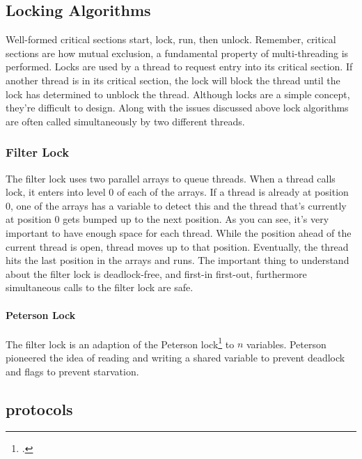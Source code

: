 \documentclass[titlepage]{article}
\begin{document}
\subsection{Locking Algorithms}

Well-formed critical sections start, lock, run, then unlock. Remember, critical sections are how mutual exclusion, a fundamental property of multi-threading is performed.  Locks are used by a thread to request entry into its critical section. If another thread is in its critical section, the lock will block the thread until the lock has determined to unblock the thread. Although locks are a simple concept, they're difficult to design. Along with the issues discussed above lock algorithms are often called simultaneously by two different threads.

\subsubsection{Filter Lock}

The filter lock uses two parallel arrays to queue threads. When a thread calls lock, it enters into level 0 of each of the arrays. If a thread is already at position 0, one of the arrays has a variable to detect this and the thread that's currently at position 0 gets bumped up to the next position. As you can see, it's very important to have enough space for each thread. While the position ahead of the current thread is open, thread moves up to that position. Eventually, the thread hits the last position in the arrays and runs. The important thing to understand about the filter lock is deadlock-free, and first-in first-out, furthermore simultaneous calls to the filter lock are safe.

\paragraph*{Peterson Lock}

The filter lock is an adaption of the Peterson lock\footcite[{P}eterson's original paper on the Peterson lock]{PETERSON1981115} to $n$ variables. Peterson pioneered the idea of reading and writing a shared variable to prevent deadlock and flags to prevent starvation.







\subsection{protocols}
\end{document}
